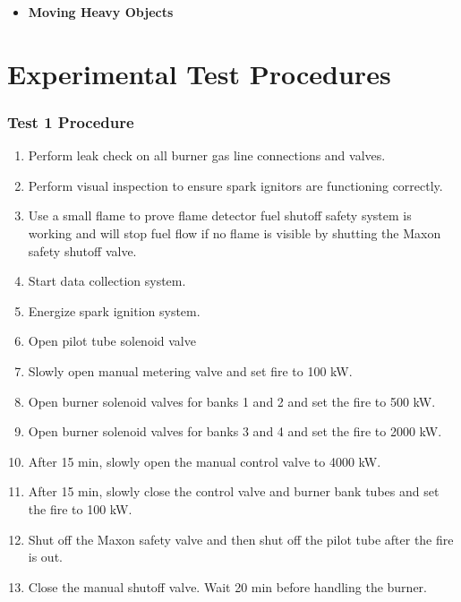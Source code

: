 \documentclass[12pt,oneside]{book}
\begin{document}
\begin{itemize}
\item {\bf Moving Heavy Objects}
\end{itemize}

\chapter{Experimental Test Procedures}
\label{test_procedure}
\subsection{Test 1 Procedure}
\label{procedure1}

\begin{enumerate}
  \item Perform leak check on all burner gas line connections and valves.
  \item Perform visual inspection to ensure spark ignitors are functioning correctly.
  \item Use a small flame to prove flame detector fuel shutoff safety system is working and will stop fuel flow if no flame is visible by shutting the Maxon safety shutoff valve.
  \item Start data collection system.
  \item Energize spark ignition system.
  \item Open pilot tube solenoid valve
  \item Slowly open manual metering valve and set fire to 100 kW.
  \item Open burner solenoid valves for banks 1 and 2 and set the fire to 500 kW.
  \item Open burner solenoid valves for banks 3 and 4 and set the fire to 2000 kW.
  \item After 15 min, slowly open the manual control valve to 4000 kW.
  \item After 15 min, slowly close the control valve and burner bank tubes and set the fire to 100 kW.
  \item Shut off the Maxon safety valve and then shut off the pilot tube after the fire is out.
  \item Close the manual shutoff valve. Wait 20 min before handling the burner.
\end{enumerate}
\end{document}
